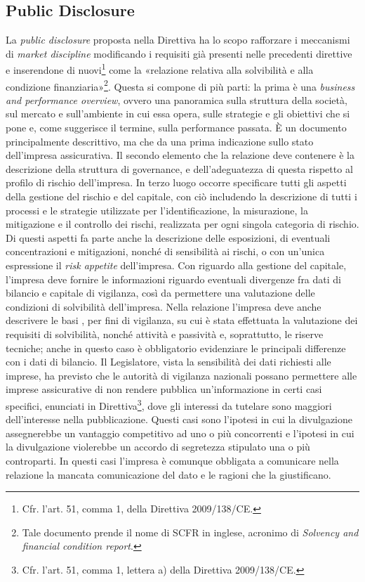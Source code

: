 \subsection{Public Disclosure}
La {\itshape public disclosure} proposta nella Direttiva ha lo scopo rafforzare i meccanismi di {\itshape market discipline} modificando i requisiti già presenti nelle precedenti direttive e inserendone di nuovi\footnote{Cfr. l’art. 51, comma 1, della Direttiva 2009/138/CE.} come la «relazione relativa alla solvibilità e alla condizione finanziaria»\footnote{Tale documento prende il nome di SCFR in inglese, acronimo di {\itshape Solvency and financial condition report}.}. 
Questa si compone di più parti: la prima è una {\itshape business and performance overview}, ovvero una panoramica sulla struttura della società, sul mercato e sull’ambiente in cui essa opera, sulle strategie e gli obiettivi che si pone e, come suggerisce il termine, sulla performance passata. È un documento principalmente descrittivo, ma che da una prima indicazione sullo stato dell’impresa assicurativa.
Il secondo elemento che la relazione deve contenere è la descrizione della struttura di governance, e dell’adeguatezza di questa rispetto al profilo di rischio dell’impresa.
In terzo luogo occorre specificare tutti gli aspetti della gestione del rischio e del capitale, con ciò includendo la descrizione di tutti i processi e le strategie utilizzate per l’identificazione, la misurazione, la mitigazione e il controllo dei rischi, realizzata per ogni singola categoria di rischio. Di questi aspetti fa parte anche la descrizione delle esposizioni, di eventuali concentrazioni e mitigazioni, nonché di sensibilità ai rischi, o con un’unica espressione il {\itshape risk appetite} dell’impresa.
Con riguardo alla gestione del capitale, l’impresa deve fornire le informazioni riguardo eventuali divergenze fra dati di bilancio e capitale di vigilanza, così da permettere una valutazione delle condizioni di solvibilità dell’impresa.
Nella relazione l’impresa deve anche descrivere le basi , per fini di vigilanza, su cui è stata effettuata la valutazione dei requisiti di solvibilità, nonché attività e passività e, soprattutto, le riserve tecniche; anche in questo caso è obbligatorio evidenziare le principali differenze con i dati di bilancio.
Il Legislatore, vista la sensibilità dei dati richiesti alle imprese, ha previsto che le autorità di vigilanza nazionali possano permettere alle imprese assicurative di non rendere pubblica un’informazione in certi casi specifici, enunciati in Direttiva\footnote{Cfr. l’art. 51, comma 1, lettera a) della Direttiva 2009/138/CE.}, dove gli interessi da tutelare sono maggiori dell’interesse nella pubblicazione. Questi casi sono l’ipotesi in cui la divulgazione assegnerebbe un vantaggio competitivo ad uno o più concorrenti e l’ipotesi in cui la divulgazione violerebbe un accordo di segretezza stipulato una o più controparti. In questi casi l’impresa è comunque obbligata a comunicare nella relazione la mancata comunicazione del dato e le ragioni che la giustificano.
